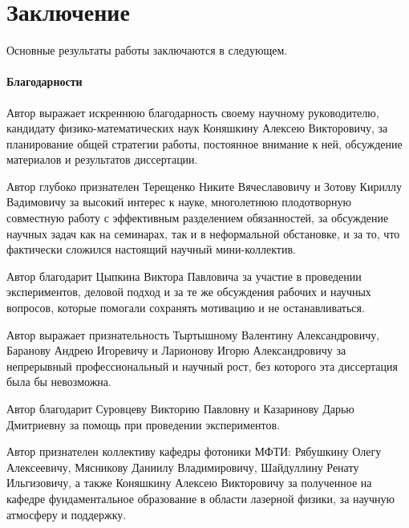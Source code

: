 \chapter*{Заключение}                       %


Основные результаты работы заключаются в следующем.



\subsubsection*{Благодарности}

Автор выражает искреннюю благодарность своему научному руководителю, кандидату физико-математических наук Коняшкину Алексею Викторовичу, за планирование общей стратегии работы, постоянное внимание к ней, обсуждение материалов и результатов диссертации.

Автор глубоко признателен Терещенко Никите Вячеславовичу и Зотову Кириллу Вадимовичу за высокий интерес к науке, многолетнюю плодотворную совместную работу с эффективным разделением обязанностей, за обсуждение научных задач как на семинарах, так и в неформальной обстановке, и за то, что фактически сложился настоящий научный мини-коллектив.

Автор благодарит Цыпкина Виктора Павловича за участие в проведении экспериментов, деловой подход и за те же обсуждения рабочих и научных вопросов, которые помогали сохранять мотивацию и не останавливаться.

Автор выражает признательность Тыртышному Валентину Александровичу, Баранову Андрею Игоревичу и Ларионову Игорю Александровичу за непрерывный профессиональный и научный рост, без которого эта диссертация была бы невозможна.

Автор благодарит Суровцеву Викторию Павловну и Казаринову Дарью Дмитриевну за помощь при проведении экспериментов.

Автор признателен коллективу кафедры фотоники МФТИ: Рябушкину Олегу Алексеевичу, Мясникову Даниилу Владимировичу, Шайдуллину Ренату Ильгизовичу, а также Коняшкину Алексею Викторовичу за полученное на кафедре фундаментальное образование в области лазерной физики, за научную атмосферу и поддержку.

